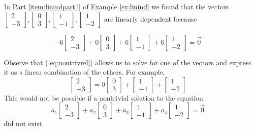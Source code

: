 \documentclass{ximera}
\begin{document}
In Part \ref{item:linindpart1} of Example \ref{ex:linind} we found that the vectors $\begin{bmatrix}2\\-3\end{bmatrix}, \begin{bmatrix}0\\3\end{bmatrix},\begin{bmatrix}1\\-1\end{bmatrix},\begin{bmatrix}1\\-2\end{bmatrix}$ are linearly dependent because

\begin{equation}\label{eq:nontrivrel}
-6\begin{bmatrix}2\\-3\end{bmatrix}+0 \begin{bmatrix}0\\3\end{bmatrix}+6\begin{bmatrix}1\\-1\end{bmatrix}+6\begin{bmatrix}1\\-2\end{bmatrix}=\vec{0}\end{equation}

Observe that (\ref{eq:nontrivrel}) allows us to solve for one of the vectors and express it as a linear combination of the others. For example, 
$$\begin{bmatrix}2\\-3\end{bmatrix}=0 \begin{bmatrix}0\\3\end{bmatrix}+\begin{bmatrix}1\\-1\end{bmatrix}+\begin{bmatrix}1\\-2\end{bmatrix}$$
This would not be possible if a nontrivial solution to the equation
$$a_1\begin{bmatrix}2\\-3\end{bmatrix}+a_2 \begin{bmatrix}0\\3\end{bmatrix}+a_3\begin{bmatrix}1\\-1\end{bmatrix}+a_4\begin{bmatrix}1\\-2\end{bmatrix}=\vec{0}$$
did not exist.
\end{document}
